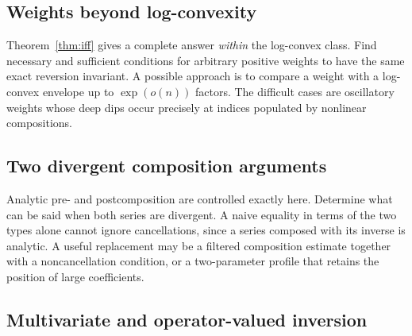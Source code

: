 \documentclass[11pt,a4paper]{article}
\numberwithin{equation}{section}
\theoremstyle{definition}
\theoremstyle{remark}
\begin{document}
\subsection{Weights beyond log-convexity}

Theorem~\ref{thm:iff} gives a complete answer \emph{within} the
log-convex class. Find necessary and sufficient conditions for arbitrary
positive weights to have the same exact reversion invariant. A possible
approach is to compare a weight with a log-convex envelope up to
$\exp(o(n))$ factors. The difficult cases are oscillatory weights whose
deep dips occur precisely at indices populated by nonlinear
compositions.

\subsection{Two divergent composition arguments}

Analytic pre- and postcomposition are controlled exactly here. Determine
what can be said when both series are divergent. A naive equality in
terms of the two types alone cannot ignore cancellations, since a series
composed with its inverse is analytic. A useful replacement may be a
filtered composition estimate together with a noncancellation condition,
or a two-parameter profile that retains the position of large
coefficients.

\subsection{Multivariate and operator-valued inversion}
\end{document}
